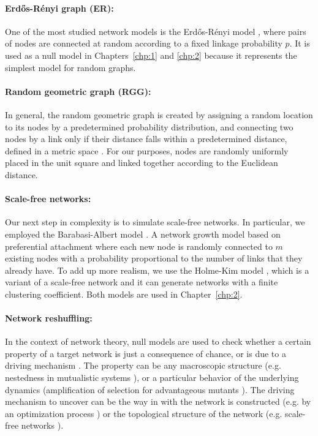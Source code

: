 \paragraph{Erd{\H{o}}s-R{\'e}nyi graph (ER):}  One of the most studied network models is the Erd{\H{o}}s-R{\'e}nyi  model \cite{erdos1959random}, where pairs of nodes are connected at random according to a fixed linkage probability $p$. It is used  as a null model in Chapters~\ref{chp:1} and \ref{chp:2} because it represents the simplest model for random graphs.

\paragraph{Random geometric graph (RGG):} 
In general, the random geometric graph is created by assigning a random location to its nodes by a predetermined probability distribution, and connecting two nodes by a link only if their distance falls within a predetermined distance, defined in a metric space \cite{Dall2002RandomGraphs}. For our purposes, nodes are randomly uniformly placed in the unit square and linked together according to the Euclidean distance.

\paragraph{Scale-free networks:} Our next step in complexity is to simulate scale-free networks. In particular, we employed the Barabasi-Albert model \cite{Albert2002StatisticalNetworks}. A network growth model based on preferential attachment where each new node is randomly connected to $m$ existing nodes with a probability proportional to the number of links that they already have.  To add up more realism, we use the Holme-Kim model \cite{Holme2002GrowingClustering}, which is a variant of a scale-free network and it can generate networks with a finite clustering coefficient. Both models are used in Chapter~\ref{chp:2}.

\paragraph{Network reshuffling:}
In the context of network theory, null models are
used to check whether a certain property of
a target network is just a consequence of chance, or
is due to a driving mechanism \cite{Newman2010}. The property can be
any macroscopic structure (e.g. nestedness in mutualistic
systems \cite{bastolla2009mutualism}), or a particular behavior of the underlying
dynamics (amplification of selection for advantageous mutants \cite{lieberman2005evolutionary}). The driving
mechanism to uncover can be the way in with the network is constructed (e.g. by an optimization process \cite{bastolla2009mutualism})
or the topological structure of the network (e.g. scale-free networks \cite{lieberman2005evolutionary}).\\

